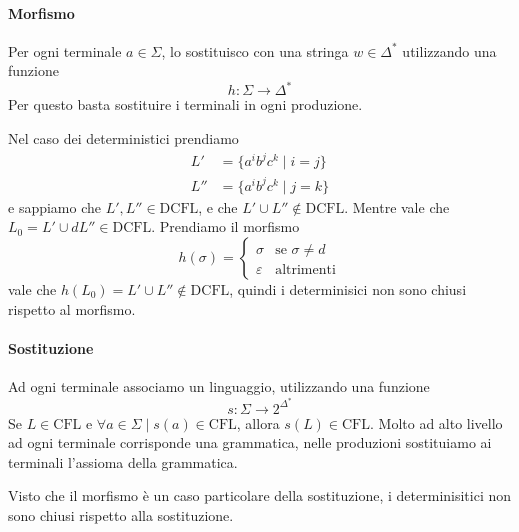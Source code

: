 \documentclass[12pt]{report}
\theoremstyle{definition}
\theoremstyle{regard}
\begin{document}
\paragraph{Morfismo} Per ogni terminale $a \in \Sigma$, lo sostituisco con una stringa $w \in \Delta^*$ utilizzando una funzione
$$ h : \Sigma \rightarrow \Delta^* $$
Per questo basta sostituire i terminali in ogni produzione.

Nel caso dei deterministici  prendiamo 
\begin{align*}
	L' &= \{ a^i b^j c^k \mid i = j \} \\
	L'' &= \{ a^i b^j c^k \mid j = k \} 
\end{align*}
e sappiamo che $L', L'' \in \text{DCFL}$, e che $L' \cup L'' \not \in \text{DCFL}$.
Mentre vale che $L_0 = L' \cup dL'' \in \text{DCFL}$.
Prendiamo il morfismo
$$ h(\sigma) = \begin{cases} \sigma & \text{se } \sigma \neq d \\ \varepsilon & \text{altrimenti} \end{cases} $$
vale che $h(L_0) = L' \cup L'' \not \in \text{DCFL}$, quindi i determinisici non sono chiusi rispetto al morfismo.

\paragraph{Sostituzione} Ad ogni terminale associamo un linguaggio, utilizzando una funzione
$$ s : \Sigma \rightarrow 2^{\Delta^*} $$
Se $L \in \text{CFL}$ e $\forall a \in \Sigma \mid s(a) \in \text{CFL}$, allora $s(L) \in \text{CFL}$.
Molto ad alto livello ad ogni terminale corrisponde una grammatica, nelle produzioni sostituiamo ai terminali l'assioma della grammatica.

Visto che il morfismo è un caso particolare della sostituzione, i determinisitici non sono chiusi rispetto alla sostituzione.

 
\end{document}
